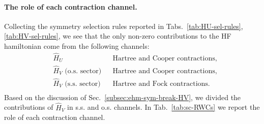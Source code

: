 %	
%


\paragraph{The role of each contraction channel.}

Collecting the symmetry selection rules reported in Tabs.~\ref{tab:HU-sel-rules}, \ref{tab:HV-sel-rules}, we see that the only non-zero contributions to the HF hamiltonian come from the following channels:
\[
\begin{aligned}
	&\hat H_U &&\text{Hartree and Cooper contractions,} \\
	&\hat H_V \text{ (o.s. sector)}
	&&\text{Hartree and Cooper contractions,} \\
	&\hat H_V \text{ (s.s. sector)}
	&&\text{Hartree and Fock contractions.} \\
\end{aligned}
\]
Based on the discussion of Sec.~\ref{subsec:ehm-sym-break-HV}, we divided the contributions of $\hat H_V$ in s.s. and o.s. channels. In Tab.~\ref{tab:sc-RWCs} we report the role of each contraction channel.

